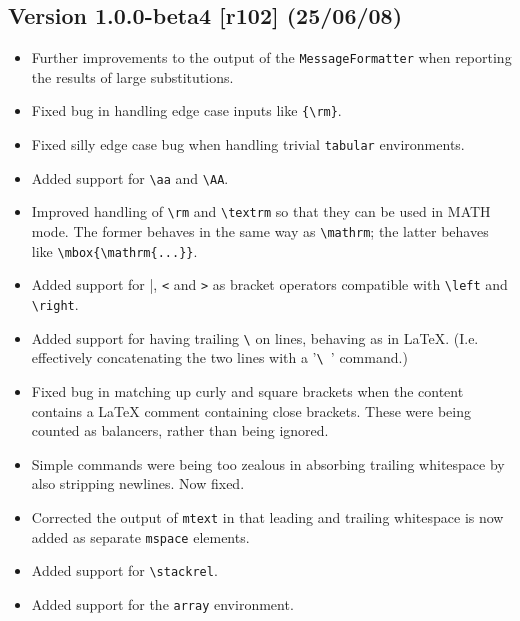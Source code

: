 \subsection*{Version 1.0.0-beta4 [r102] (25/06/08)}

\begin{itemize}

  \item Further improvements to the output of the \verb|MessageFormatter| when
  reporting the results of large substitutions.

  \item Fixed bug in handling edge case inputs like \verb|{\rm}|.

  \item Fixed silly edge case bug when handling trivial \verb|tabular|
  environments.

  \item Added support for \verb|\aa| and \verb|\AA|.

  \item Improved handling of \verb|\rm| and \verb|\textrm| so that they can be
  used in MATH mode. The former behaves in the same way as \verb|\mathrm|; the
  latter behaves like \verb|\mbox{\mathrm{...}}|.

  \item Added support for \verb|||, \verb|<| and \verb|>| as bracket operators
  compatible with \verb|\left| and \verb|\right|.

  \item Added support for having trailing \verb|\| on lines, behaving as in
  LaTeX.  (I.e. effectively concatenating the two lines with a '\verb|\ |'
  command.)

  \item Fixed bug in matching up curly and square brackets when the content
  contains a LaTeX comment containing close brackets. These were being counted
  as balancers, rather than being ignored.

  \item Simple commands were being too zealous in absorbing trailing whitespace
  by also stripping newlines. Now fixed.

  \item Corrected the output of \verb|mtext| in that leading and trailing
  whitespace is now added as separate \verb|mspace| elements.

  \item Added support for \verb|\stackrel|.

  \item Added support for the \verb|array| environment.


\end{itemize}
